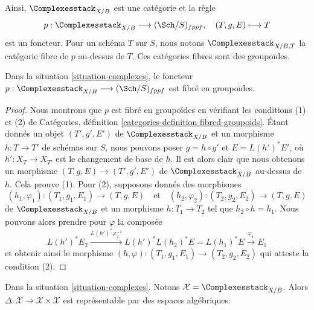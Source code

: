 \noindent
Ainsi, $\Complexesstack_{X/B}$ est une catégorie et la règle
$$
p : \Complexesstack_{X/B} \longrightarrow (\Sch/S)_{fppf},
\quad
(T, g, E) \longmapsto T
$$
est un foncteur. Pour un schéma $T$ sur $S$, nous notons
$\Complexesstack_{X/B, T}$ la catégorie fibre de $p$ au-dessus de $T$.
Ces catégories fibres sont des groupoïdes.

\begin{lemma}
\label{lemma-complexes-fibred-in-groupoids}
Dans la situation \ref{situation-complexes}, le foncteur
$p : \Complexesstack_{X/B} \longrightarrow (\Sch/S)_{fppf}$
est fibré en groupoïdes.
\end{lemma}

\begin{proof}
Nous montrons que $p$ est fibré en groupoïdes en vérifiant les conditions (1)
et (2) de Catégories, définition
\ref{categories-definition-fibred-groupoids}.
Étant donnés un objet $(T', g', E')$ de $\Complexesstack_{X/B}$ et un morphisme
$h : T \to T'$ de schémas sur $S$, nous pouvons poser $g = h \circ g'$ et
$E = L(h')^*E'$, où $h' : X_T \to X_{T'}$ est le changement de base de $h$.
Il est alors clair que nous obtenons un morphisme
$(T, g, E) \to (T', g', E')$ de $\Complexesstack_{X/B}$ au-dessus de $h$.
Cela prouve (1).
Pour (2), supposons donnés des morphismes
$$
(h_1, \varphi_1) : (T_1, g_1, E_1) \to (T, g, E)
\quad\text{et}\quad
(h_2, \varphi_2) : (T_2, g_2, E_2) \to (T, g, E)
$$
de $\Complexesstack_{X/B}$ et un morphisme $h : T_1 \to T_2$ tel que
$h_2 \circ h = h_1$. Nous pouvons alors prendre pour $\varphi$ la composée
$$
L(h')^*E_2
\xrightarrow{L(h')^*\varphi_2^{-1}}
L(h')^*L(h_2)^*E = L(h_1)^*E
\xrightarrow{\varphi_1}
E_1
$$
et obtenir ainsi le morphisme
$(h, \varphi) : (T_1, g_1, E_1) \to (T_2, g_2, E_2)$
qui atteste la condition (2).
\end{proof}

\begin{lemma}
\label{lemma-complexes-diagonal}
Dans la situation \ref{situation-complexes}. Notons
$\mathcal{X} = \Complexesstack_{X/B}$. Alors
$\Delta : \mathcal{X} \to \mathcal{X} \times \mathcal{X}$ est représentable
par des espaces algébriques.
\end{lemma}

